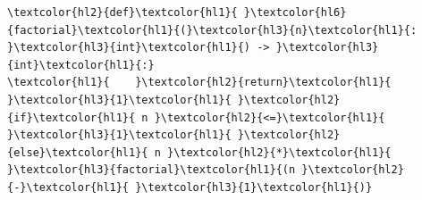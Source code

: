 \documentclass[11pt]{article}
\begin{document}
\begin{srccode}
\begin{Verbatim}[commandchars=\\\{\}]
\textcolor{hl2}{def}\textcolor{hl1}{ }\textcolor{hl6}{factorial}\textcolor{hl1}{(}\textcolor{hl3}{n}\textcolor{hl1}{: }\textcolor{hl3}{int}\textcolor{hl1}{) -> }\textcolor{hl3}{int}\textcolor{hl1}{:}
\textcolor{hl1}{    }\textcolor{hl2}{return}\textcolor{hl1}{ }\textcolor{hl3}{1}\textcolor{hl1}{ }\textcolor{hl2}{if}\textcolor{hl1}{ n }\textcolor{hl2}{<=}\textcolor{hl1}{ }\textcolor{hl3}{1}\textcolor{hl1}{ }\textcolor{hl2}{else}\textcolor{hl1}{ n }\textcolor{hl2}{*}\textcolor{hl1}{ }\textcolor{hl3}{factorial}\textcolor{hl1}{(n }\textcolor{hl2}{-}\textcolor{hl1}{ }\textcolor{hl3}{1}\textcolor{hl1}{)}
\end{Verbatim}
\end{srccode}
\end{document}
